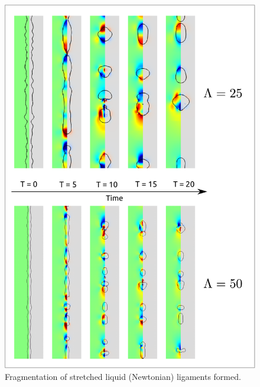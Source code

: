 \begin{figure}
\centering
\includegraphics{plots/ligament_breakup/aspect_compare.pdf}
\caption{Fragmentation of stretched liquid (Newtonian) ligaments formed. 
	}
\label{asp_comp}
\end{figure}

